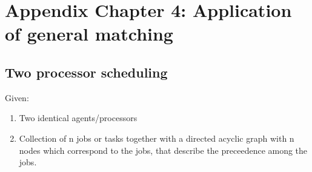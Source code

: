 \chapter{ Appendix Chapter 4: Application of general matching}

\section{Two processor scheduling}

Given:\\
\begin{enumerate}
  \item Two identical agents/processors
  \item Collection of n jobs or tasks together with a directed acyclic graph with n nodes which correspond to the jobs, that describe the preceedence among the jobs.
\end{enumerate}


